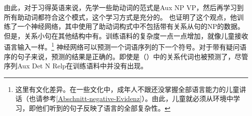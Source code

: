 由此，对于习得英语来说，先学一些助动词的范式是Aux NP VP，然后再学习到所有助动词都符合这个模式，这个学习方式是充分的。 \citet{LE2001a}也证明了这个观点，他训练了一个神经网络，其中使用了助动词构式中不包括带有关系从句的NP的数据。但是，关系小句在其他结构中有。训练语料的复杂度一点一点增加，就像儿童接收语言输入一样\citep{Elman93a}。\footnote{%
  这里有文化差异。在一些文化中，成年人不跟还没掌握全部语言能力的儿童讲话\citep{Ochs82a,OS85a}（也请参考\ref{Abschnitt-negative-Evidenz}）。由此，儿童就必须从环境中学习，即他们听到的句子反映了语言的全部复杂性。
} 神经网络可以预测一个词语序列的下一个符号。对于带有疑问语序的句子来说，预测的结果是正确的。即使是（）中的关系代词也被预测了，尽管序列Aux Det N Relp在训练语料中并没有出现。
